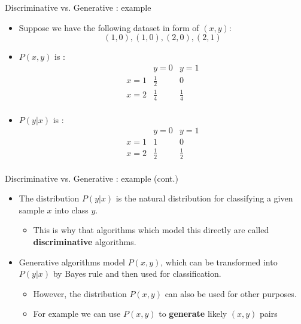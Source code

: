 \documentclass[serif, aspectratio=169]{beamer}
\begin{document}
    \begin{frame}{Discriminative vs. Generative : example}
        \begin{itemize}
            \item Suppose we have the following dataset in form of $(x, y)$:
            \[
                (1,0), (1,0), (2,0), (2,1)
            \]
            \item $P(x,y)$ is :
            \[
                \begin{array}{c|cc}
                    & y=0 & y=1 \\
                    \hline
                    x=1 & \frac{1}{2} & 0 \\
                    x=2 & \frac{1}{4} & \frac{1}{4} \\
                \end{array}
            \]
            \item $P(y|x)$ is :
            \[
                \begin{array}{c|cc}
                    & y=0 & y=1 \\
                    \hline
                    x=1 & 1 & 0 \\
                    x=2 & \frac{1}{2} & \frac{1}{2} \\
                \end{array}
            \]
        \end{itemize}
    \end{frame}


    \begin{frame}{Discriminative vs. Generative : example (cont.)}
        \begin{itemize}
            \item The distribution $P(y|x)$ is the natural distribution for classifying a given sample $x$ into class $y$.
            \begin{itemize}
                \item This is why that algorithms which model this directly are called \textbf{discriminative} algorithms.
            \end{itemize}
            \item Generative algorithms model $P(x,y)$, which can be transformed into $P(y|x)$ by Bayes rule and then used for classification.
            \begin{itemize}
                \item However, the distribution $P(x,y)$ can also be used for other purposes.
                \item For example we can use $P(x,y)$ to \textbf{generate} likely $(x,y)$ pairs
            \end{itemize}
        \end{itemize}
    \end{frame}
\end{document}
